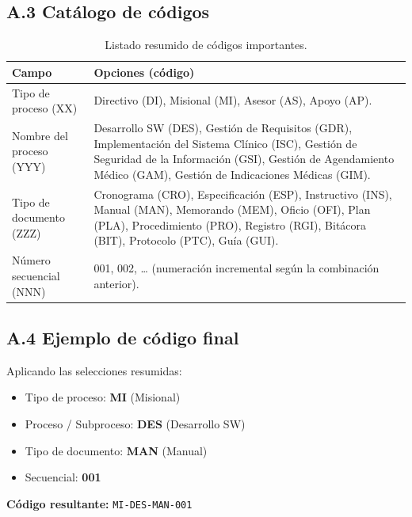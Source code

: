 \documentclass[a4paper,12pt]{article}
\begin{document}
    \subsection*{A.3 Catálogo de códigos}
    \begin{table}[h!]
    \centering
    \small
    \begin{tabularx}{\linewidth}{@{}lX@{}}
    \toprule
    \textbf{Campo} & \textbf{Opciones (código)} \\ \midrule

    Tipo de proceso (XX) &
    Directivo (DI), Misional (MI), Asesor (AS), Apoyo (AP). \\

    Nombre del proceso (YYY) &
    Desarrollo SW (DES), Gestión de Requisitos (GDR), Implementación del Sistema Clínico (ISC), 
    Gestión de Seguridad de la Información (GSI), Gestión de Agendamiento Médico (GAM), 
    Gestión de Indicaciones Médicas (GIM). \\

    Tipo de documento (ZZZ) &
    Cronograma (CRO), Especificación (ESP), Instructivo (INS), Manual (MAN), Memorando (MEM), 
    Oficio (OFI), Plan (PLA), Procedimiento (PRO), Registro (RGI), Bitácora (BIT), 
    Protocolo (PTC), Guía (GUI). \\

    Número secuencial (NNN) &
    001, 002, … (numeración incremental según la combinación anterior). \\

    \bottomrule
    \end{tabularx}
    \caption*{\footnotesize Listado resumido de códigos importantes.}
    \end{table}

    \subsection*{A.4 Ejemplo de código final}
    Aplicando las selecciones resumidas:
    \begin{itemize}
      \item Tipo de proceso: \textbf{MI} (Misional)
      \item Proceso / Subproceso: \textbf{DES} (Desarrollo SW)
      \item Tipo de documento: \textbf{MAN} (Manual)
      \item Secuencial: \textbf{001}
    \end{itemize}

    \noindent\textbf{Código resultante:} \texttt{MI-DES-MAN-001}
\end{document}
